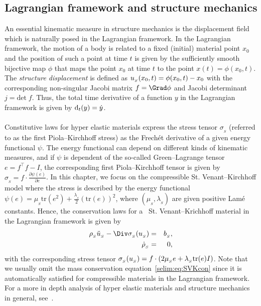 \subsection{ Lagrangian framework and structure mechanics}

An essential kinematic measure in structure mechanics is the
displacement field which is naturally posed in the Lagrangian
framework.  In the Lagrangian framework, the motion of a body is
related to a fixed (initial) material point $x_0$ and the position of
such a point at time $t$ is given by the sufficiently smooth bijective
map $\phi$ that maps the point $x_0$ at time $t$ to the point $x(t)=
\phi(x_0,t)$. The \emph{structure displacement} is defined as
$u_{_{S}}(x_0,t) = \phi(x_0, t) - x_0$ with the corresponding non-singular
Jacobi matrix $f = \Grad\phi$ and Jacobi determinant $j =
\textrm{det}\; f$. Thus, the total time derivative of a function $y$
in the Lagrangian framework is given by $\textrm{d}_t(y) = \dot{y}$.
\\\\ 
Constitutive laws for hyper elastic materials express the stress
tensor $\sigma_{_{S}}$ (referred to as the first Piola--Kirchhoff
stress) as the Frech\'{e}t derivative of a given energy functional
$\psi$.  The energy functional can depend on different kinds of
kinematic measures, and if $\psi$ is dependent of the so-called
Green--Lagrange tensor $e= f^{\top}f -I$, the corresponding first
Piola--Kirchhoff tensor is given by $\sigma_{_{S}} =
f\cdot\frac{\partial \psi(e)}{\partial e}$. In this chapter, we focus
on the compressible St. Venant--Kirchhoff model where the stress is
described by the energy functional $\psi(e) =
\mu_{_{S}}\textrm{tr}(e^2) +
\frac{\lambda_{_{S}}}{2}(\textrm{tr}(e))^2$, where
$(\mu_{_{S}},\lambda_{_{S}})$ are given positive Lam\'{e}
constants. Hence, the conservation laws for a ~St. Venant--Krichhoff
material in the Lagrangian framework is given by
\begin{eqnarray}
\label{selim:eq:SVKmom}
\rhoS \ddotuS - \Div\sigmaS(\uS) &=& b_{_{S}}, \\
\label{selim:eq:SVKcon}
\dot{\rho}_{_{S}}&=&0,
\end{eqnarray}
with the corresponding stress tensor $\sigma_{_{S}}(u_{_{S}}) =
f\cdot(2\mu_{_{S}}e + \lambda_{_{S}} \textrm{tr}(e)I)$.  Note that we
usually omit the mass conservation equation~\eqref{selim:eq:SVKcon}
since it is automatically satisfied for compressible materials in the
Lagrangian framework.  For a more in depth analysis of hyper elastic
materials and structure mechanics in general, see~\cite{Gurtin1981,
  Holzapfel2000, Narayanan2007}.

